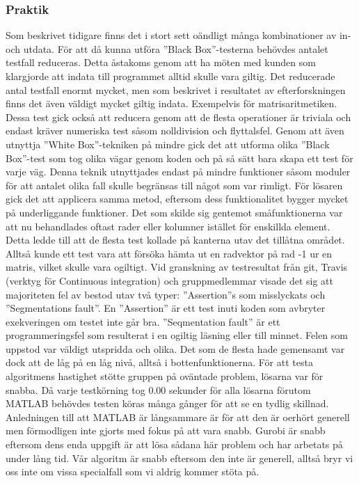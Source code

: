 	\subsubsection{Praktik}
	Som beskrivet tidigare finns det i stort sett oändligt många kombinationer av in- och utdata.	För att då kunna utföra ''Black Box''-testerna behövdes antalet testfall reduceras. Detta åstakoms genom att ha möten med kunden som klargjorde att indata till programmet alltid skulle vara giltig. Det reducerade antal testfall enormt mycket, men som beskrivet i resultatet av efterforskningen finns det även väldigt mycket giltig indata. Exempelvis för matrisaritmetiken. Dessa test gick också att reducera genom att de flesta operationer är triviala och endast kräver numeriska test såsom nolldivision och flyttalsfel. Genom att även utnyttja ''White Box''-tekniken på mindre gick det att utforma olika ''Black Box''-test som tog olika vägar genom koden och på så sätt bara skapa ett test för varje väg. Denna teknik utnyttjades endast på mindre funktioner såsom moduler för att antalet olika fall skulle begränsas till något som var rimligt. \newline
	För lösaren gick det att applicera samma metod, eftersom dess funktionalitet bygger mycket på underliggande funktioner. Det som skilde sig gentemot småfunktionerna var att nu behandlades oftast rader eller kolumner istället för enskillda element. Detta ledde till att de flesta test kollade på kanterna utav det tillåtna området. Alltså kunde ett test vara att försöka hämta ut en radvektor på rad -1 ur en matris, vilket skulle vara ogiltigt.\newline
Vid granskning av testresultat från git, Travis (verktyg för Continuous integration) och gruppmedlemmar visade det sig att majoriteten fel av bestod utav två typer: ''Assertion''s som misslyckats och ''Segmentations fault''. En ''Assertion'' är ett test inuti koden som avbryter exekveringen om testet inte går bra. ''Seqmentation fault'' är ett programmeringsfel som resulterat i en ogiltig läsning eller till minnet. Felen som uppstod var väldigt utspridda och olika. Det som de flesta hade gemensamt var dock att de låg på en låg nivå, alltså i bottenfunktionerna. \newline	
	För att testa algoritmens hastighet stötte gruppen på oväntade problem, lösarna var för snabba.	Då varje testkörning tog 0.00 sekunder för alla lösarna förutom MATLAB behövdes testen köras många gånger för att se en tydlig skillnad. Anledningen till att MATLAB är långsammare är för att den är oerhört generell men förmodligen inte gjorts med fokus på att vara snabb. Gurobi är snabb eftersom dens enda uppgift är att lösa sådana här problem och har arbetats på under lång tid. Vår algoritm är snabb eftersom den inte är generell, alltså bryr vi oss inte om vissa specialfall som vi aldrig kommer stöta på. \newline
